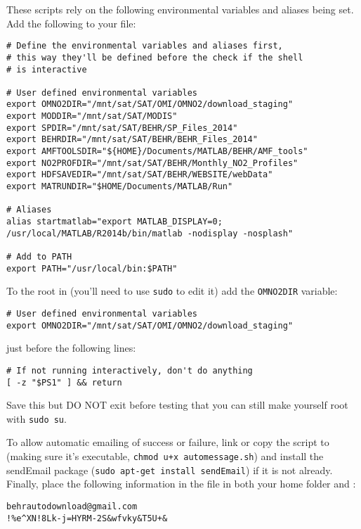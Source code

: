 \documentclass[12pt]{article}
\begin{document}
	These scripts rely on the following environmental variables and aliases being set. Add the following to your  file:
\begin{lstlisting}
# Define the environmental variables and aliases first,
# this way they'll be defined before the check if the shell
# is interactive

# User defined environmental variables
export OMNO2DIR="/mnt/sat/SAT/OMI/OMNO2/download_staging"
export MODDIR="/mnt/sat/SAT/MODIS"
export SPDIR="/mnt/sat/SAT/BEHR/SP_Files_2014"
export BEHRDIR="/mnt/sat/SAT/BEHR/BEHR_Files_2014"
export AMFTOOLSDIR="${HOME}/Documents/MATLAB/BEHR/AMF_tools"
export NO2PROFDIR="/mnt/sat/SAT/BEHR/Monthly_NO2_Profiles"
export HDFSAVEDIR="/mnt/sat/SAT/BEHR/WEBSITE/webData"
export MATRUNDIR="$HOME/Documents/MATLAB/Run"

# Aliases
alias startmatlab="export MATLAB_DISPLAY=0; /usr/local/MATLAB/R2014b/bin/matlab -nodisplay -nosplash"

# Add to PATH
export PATH="/usr/local/bin:$PATH"
\end{lstlisting}

	To the root  in  (you'll need to use \lstinline$sudo$ to edit it) add the \lstinline$OMNO2DIR$ variable:
\begin{lstlisting}
# User defined environmental variables
export OMNO2DIR="/mnt/sat/SAT/OMI/OMNO2/download_staging"
\end{lstlisting}
just before the following lines:
\begin{lstlisting}
# If not running interactively, don't do anything
[ -z "$PS1" ] && return
\end{lstlisting}

	Save this but DO NOT exit before testing that you can still make yourself root with \lstinline$sudo su$.
	
	To allow automatic emailing of success or failure, link or copy the  script to  (making sure it's executable, \lstinline$chmod u+x automessage.sh$) and install the sendEmail package (\lstinline$sudo apt-get install sendEmail$) if it is not already. Finally, place the following information in the file  in both your home folder and :
\begin{lstlisting}
behrautodownload@gmail.com
!%e^XN!8Lk-j=HYRM-2S&wfvky&T5U+&
\end{lstlisting}
\end{document}
